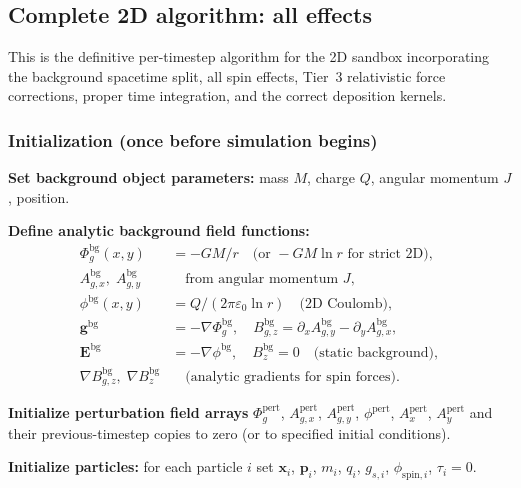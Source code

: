 \documentclass[11pt,a4paper]{article}
\newcommand{\vv}[1]{\mathbf{#1}}
\newcommand{\Phig}{\Phi_g}
\begin{document}
\subsection{Complete 2D algorithm: all effects}
\label{sec:alg_2d}

This is the definitive per-timestep algorithm for the 2D sandbox incorporating the background spacetime split, all spin effects, Tier~3 relativistic force corrections, proper time integration, and the correct deposition kernels.

\subsubsection*{Initialization (once before simulation begins)}

\begin{algsteps}
  \item \textbf{Set background object parameters:} mass $M$, charge $Q$, angular momentum $J$, position.

  \item \textbf{Define analytic background field functions:}
  \begin{align}
    \Phig^{\mathrm{bg}}(x,y) &= -GM/r \quad\text{(or }-GM\ln r\text{ for strict 2D)}, \\
    A_{g,x}^{\mathrm{bg}},\; A_{g,y}^{\mathrm{bg}} &\quad\text{from angular momentum }J, \\
    \phi^{\mathrm{bg}}(x,y)  &= Q/(2\pi\varepsilon_0\ln r) \quad\text{(2D Coulomb)}, \\
    \vv{g}^{\mathrm{bg}}     &= -\nabla\Phig^{\mathrm{bg}}, \quad
    B_{g,z}^{\mathrm{bg}}  = \partial_x A_{g,y}^{\mathrm{bg}} - \partial_y A_{g,x}^{\mathrm{bg}}, \\
    \vv{E}^{\mathrm{bg}}     &= -\nabla\phi^{\mathrm{bg}}, \quad
    B_z^{\mathrm{bg}} = 0 \quad\text{(static background)}, \\
    \nabla B_{g,z}^{\mathrm{bg}},\; \nabla B_z^{\mathrm{bg}} &\quad\text{(analytic gradients for spin forces).}
  \end{align}

  \item \textbf{Initialize perturbation field arrays} $\Phig^{\mathrm{pert}}$, $A_{g,x}^{\mathrm{pert}}$, $A_{g,y}^{\mathrm{pert}}$, $\phi^{\mathrm{pert}}$, $A_x^{\mathrm{pert}}$, $A_y^{\mathrm{pert}}$ and their previous-timestep copies to zero (or to specified initial conditions).

  \item \textbf{Initialize particles:} for each particle $i$ set $\vv{x}_i$, $\vv{p}_i$, $m_i$, $q_i$, $g_{s,i}$, $\phi_{\mathrm{spin},i}$, $\tau_i = 0$.
\end{algsteps}
\end{document}
